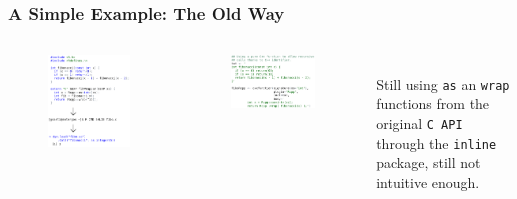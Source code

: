 \documentclass{beamer}
\def\code#1{\texttt{#1}} %
\begin{document}
\begin{frame}
\frametitle{A Simple Example: The Old Way}
\begin{columns}
\begin{figure}[htb]
    \centering
    \includegraphics[width=1\textwidth]{old-way-1.png}
\end{figure} \pause
{}
\begin{figure}[htb]
    \centering
    \includegraphics[width=1\textwidth]{old-way-2.png}
\end{figure} \pause
\\
\vspace{3mm}
Still using \code{as} an \code{wrap} functions from the original \code{C API} through the \code{inline} package, still not intuitive enough.
\end{columns}
\end{frame}
\end{document}
